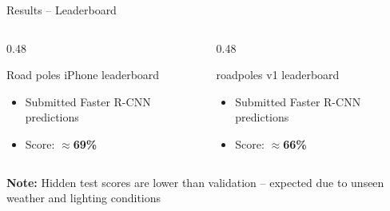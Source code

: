 \documentclass[aspectratio=169]{beamer}
\begin{document}
\begin{frame}{Results -- Leaderboard}
  \begin{columns}
    \begin{column}{0.48\textwidth}
      \begin{block}{Road poles iPhone leaderboard}
        \begin{itemize}
          \item Submitted Faster R-CNN predictions
          \item Score: \textbf{$\approx$69\%}
        \end{itemize}
      \end{block}
    \end{column}
    \begin{column}{0.48\textwidth}
      \begin{block}{roadpoles v1 leaderboard}
        \begin{itemize}
          \item Submitted Faster R-CNN predictions
          \item Score: \textbf{$\approx$66\%}
        \end{itemize}
      \end{block}
    \end{column}
  \end{columns}
  \vspace{1em}
  \textbf{Note:} Hidden test scores are lower than validation -- expected due to unseen weather and lighting conditions
\end{frame}
\end{document}
